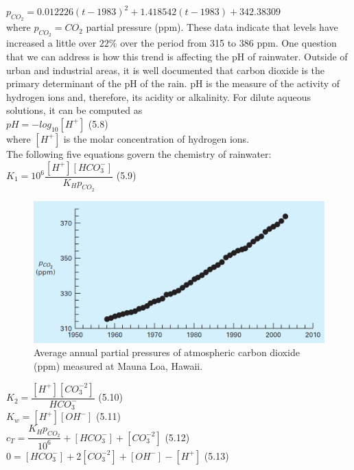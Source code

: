 \documentclass[../main.tex]{subfiles}
\begin{document}
$p_{CO_2} = 0.012226(t - 1983)^2 + 1.418542(t - 1983) + 342.38309$\\

\noindent where $p_{CO_2} = CO_2$ partial pressure (ppm). These data indicate that levels have increased a
little over $22\%$ over the period from 315 to 386 ppm.
One question that we can address is how this trend is affecting the pH of rainwater.
Outside of urban and industrial areas, it is well documented that carbon dioxide is the primary
determinant of the pH of the rain. pH is the measure of the activity of hydrogen ions
and, therefore, its acidity or alkalinity. For dilute aqueous solutions, it can be computed as\\

$pH=-log_{10}[H^+]$
\hfill (5.8)\\

\noindent where $[H^+]$ is the molar concentration of hydrogen ions.\\
\noindent The following five equations govern the chemistry of rainwater:\\

$K_1 = 10^6 \dfrac{[H^+][HCO^-_3]}{K_H p_{CO_2}}$
\hfill (5.9)\\

\begin{figure}[h]
    \includegraphics[width=0.7\linewidth]{./images/fig_5_10}
    \caption{Average annual partial pressures of atmospheric carbon dioxide (ppm) measured at Mauna Loa,
    Hawaii.}
\end{figure}

$K_2=\dfrac{[H^+][CO^{-2}_3]}{HCO^-_3}$
\hfill (5.10)\\

$K_w = [H^+][OH^-]$
\hfill (5.11)\\

$c_T=\dfrac{K_H p_{CO_2}}{10^6}+[HCO^-_3]+[CO^{-2}_3]$
\hfill (5.12)\\

$0=[HCO^-_3]+2[CO^{-2}_3]+[OH^-]-[H^+]$
\hfill (5.13)\\
\end{document}
